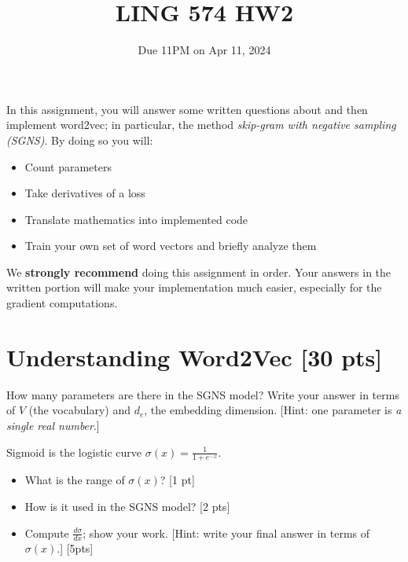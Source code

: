 \documentclass[11pt]{article}
\begin{document}
\title{LING 574 HW2}
\date{\vspace{-0.2in}Due 11PM on Apr 11, 2024}
\maketitle


In this assignment, you will answer some written questions about and then implement word2vec; in particular, the method \emph{skip-gram with negative sampling (SGNS)}.  By doing so you will:
\begin{itemize}
  \item Count parameters
  \item Take derivatives of a loss
  \item Translate mathematics into implemented code
  \item Train your own set of word vectors and briefly analyze them
\end{itemize}
We \textbf{strongly recommend} doing this assignment in order.  Your answers in the written portion will make your implementation much easier, especially for the gradient computations.


\section{Understanding Word2Vec [30 pts]}

  How many parameters are there in the SGNS model?  Write your answer in terms of $V$ (the vocabulary) and $d_e$, the embedding dimension.  [Hint: one parameter is \emph{a single real number}.]


\vspace{2em}
  Sigmoid is the logistic curve $\sigma(x) = \frac{1}{1+e^{-x}}$.
\begin{itemize}
  \item What is the range of $\sigma(x)$? [1 pt]
  \item How is it used in the SGNS model? [2 pts]
  \item Compute $\frac{d\sigma}{dx}$; show your work.  [Hint: write your final answer in terms of $\sigma(x)$.] [5pts]
\end{itemize}
\end{document}
